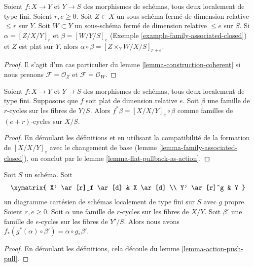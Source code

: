 \begin{lemma} 
\label{lemma-construction-closed} 
Soient  $f : X \to Y$  et  $Y \to S$  des morphismes de schémas, tous deux localement 
de type fini. Soient $r, e \geq 0$. Soit $Z \subset X$ un sous-schéma
 fermé de dimension relative  $\leq r$  sur  $Y$. 
Soit  $W \subset Y$  un sous-schéma fermé de dimension relative  $\leq e$
  sur  $S$. Si $\alpha = [Z/X/Y]_r$  et  $\beta = [W/Y/S]_e$
  (Exemple  \ref{example-family-associated-closed}) et  $Z$  est plat sur $Y$, 
alors  $\alpha \circ \beta = [Z \times_Y W/X/S]_{r + e}$. 
\end{lemma} 

\begin{proof} 
Il s'agit d'un cas particulier du lemme \ref{lemma-construction-coherent} si 
nous prenons $\mathcal{F} = \mathcal{O}_Z$ et  $\mathcal{F} = \mathcal{O}_W$. 
\end{proof} 

\begin{lemma} 
\label{lemma-flat-pullback-as-composition} Soient
  $f : X \to Y$  et  $Y \to S$  des morphismes de schémas, tous deux localement de 
type fini. Supposons que  $f$  soit plat de dimension relative  $e$. Soit  $\beta$  une
 famille de  $r$-cycles sur les fibres de  $Y/S$. Alors  
$f^*\beta = [X/X/Y]_e \circ \beta$
  comme familles de $(e + r)$-cycles sur  $X/S$. 
\end{lemma} 

\begin{proof} 
En déroulant les définitions et en utilisant la compatibilité de la formation de 
$[X/X/Y]_e$ avec le changement de base 
(lemme \ref{lemma-family-associated-closed}), on conclut par le 
lemme \ref{lemma-flat-pullback-as-action}. 
\end{proof} 

\begin{lemma} 
\label{lemma-construction-push-pull} 
Soit  $S$  un schéma. Soit 
$$
\xymatrix{
X' \ar[r]_f \ar[d] & X \ar[d] \\
Y' \ar[r]^g & Y
}
$$
 un diagramme cartésien de schémas localement de type fini sur  $S$
  avec $g$ propre. Soient $r, e \geq 0$. Soit $\alpha$ une famille de 
$r$-cycles sur les fibres de  $X/Y$. Soit  $\beta'$  une famille de  
$e$-cycles sur les fibres de  $Y'/S$. Alors nous avons 
$f_*(g^*(\alpha) \circ \beta') = \alpha \circ g_*\beta'$. 
\end{lemma} 

\begin{proof}
 En déroulant les définitions, cela découle du 
lemme \ref{lemma-action-push-pull}. 
\end{proof} 

